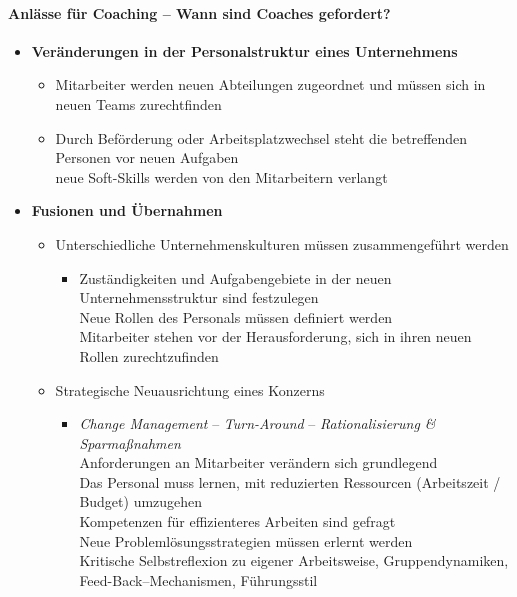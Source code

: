 \documentclass[11pt,a4paper]{article}
\begin{document}
\paragraph{\textsf{Anlässe für Coaching -- Wann sind Coaches gefordert?}}
\begin{itemize}
\item \textbf{Veränderungen in der Personalstruktur eines Unternehmens}

	\begin{itemize}
	\item Mitarbeiter werden neuen Abteilungen zugeordnet und müssen sich in neuen Teams zurechtfinden
	\item Durch Beförderung oder Arbeitsplatzwechsel steht die betreffenden Personen vor neuen Aufgaben\\
	 neue Soft-Skills werden von den Mitarbeitern verlangt
	\end{itemize}

\item \textbf{Fusionen und Übernahmen}

	\begin{itemize}
	\item Unterschiedliche Unternehmenskulturen müssen zusammengeführt werden

		\begin{itemize}
		\item[\textbullet] Zuständigkeiten und Aufgabengebiete in der neuen Unternehmensstruktur sind festzulegen\\
		 Neue Rollen des Personals müssen definiert werden\\
		 Mitarbeiter stehen vor der Herausforderung, sich in ihren neuen Rollen zurechtzufinden
		\end{itemize}

	\item Strategische Neuausrichtung eines Konzerns

		\begin{itemize}
		\item[\textbullet] \textsl{Change Management} -- \textsl{Turn-Around} -- \textsl{Rationalisierung \& Sparmaßnahmen}\\
		 Anforderungen an Mitarbeiter verändern sich grundlegend\\
		 Das Personal muss lernen, mit reduzierten Ressourcen (Arbeitszeit / Budget) umzugehen\\
		 Kompetenzen für effizienteres Arbeiten sind gefragt\\
		 Neue Problemlösungsstrategien müssen erlernt werden\\
		 Kritische Selbstreflexion zu eigener Arbeitsweise, Gruppendynamiken, Feed-Back--Mechanismen, Führungsstil
		\end{itemize}


	\end{itemize}
\end{itemize}
\end{document}
